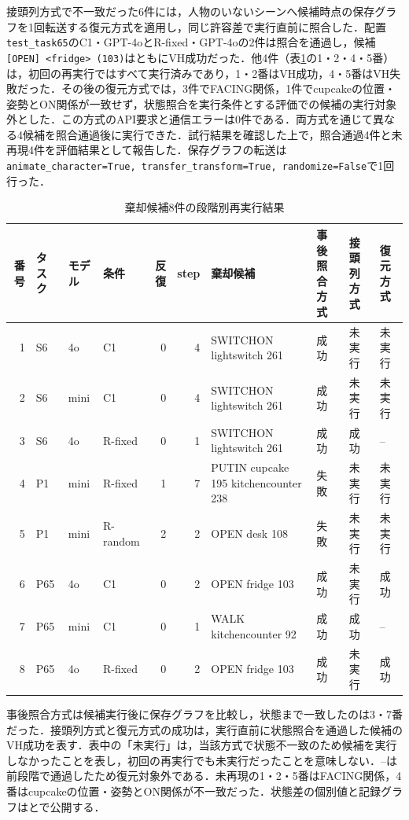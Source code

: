 接頭列方式で不一致だった6件には，人物のいないシーンへ候補時点の保存グラフを1回転送する復元方式を適用し，同じ許容差で実行直前に照合した．配置\texttt{test\_task65}のC1・GPT-4oとR-fixed・GPT-4oの2件は照合を通過し，候補\texttt{[OPEN] <fridge> (103)}はともにVH成功だった．他4件（表\ref{tab:replay_summary}の1・2・4・5番）は，初回の再実行ではすべて実行済みであり，1・2番はVH成功，4・5番はVH失敗だった．その後の復元方式では，3件でFACING関係，1件でcupcakeの位置・姿勢とON関係が一致せず，状態照合を実行条件とする評価での候補の実行対象外とした．この方式のAPI要求と通信エラーは0件である．両方式を通じて異なる4候補を照合通過後に実行できた．試行結果を確認した上で，照合通過4件と未再現4件を評価結果として報告した．保存グラフの転送は\texttt{animate\_character=True, transfer\_transform=True, randomize=False}で1回行った．


\begin{table}[tb]
\caption{棄却候補8件の段階別再実行結果}\label{tab:replay_summary}
\centering\scriptsize\setlength{\tabcolsep}{3pt}
\begin{tabular}{rlllrrp{}lll}
\hline
番号 & タスク & モデル & 条件 & 反復 & step & 棄却候補 & 事後照合方式 & 接頭列方式 & 復元方式 \\
\hline
1 & S6 & 4o & C1 & 0 & 4 & SWITCHON lightswitch 261 & 成功 & 未実行 & 未実行 \\
2 & S6 & mini & C1 & 0 & 4 & SWITCHON lightswitch 261 & 成功 & 未実行 & 未実行 \\
3 & S6 & 4o & R-fixed & 0 & 1 & SWITCHON lightswitch 261 & 成功 & 成功 & -- \\
4 & P1 & mini & R-fixed & 1 & 7 & PUTIN cupcake 195 kitchencounter 238 & 失敗 & 未実行 & 未実行 \\
5 & P1 & mini & R-random & 2 & 2 & OPEN desk 108 & 失敗 & 未実行 & 未実行 \\
6 & P65 & 4o & C1 & 0 & 2 & OPEN fridge 103 & 成功 & 未実行 & 成功 \\
7 & P65 & mini & C1 & 0 & 1 & WALK kitchencounter 92 & 成功 & 成功 & -- \\
8 & P65 & 4o & R-fixed & 0 & 2 & OPEN fridge 103 & 成功 & 未実行 & 成功 \\
\hline
\end{tabular}
\end{table}
事後照合方式は候補実行後に保存グラフを比較し，状態まで一致したのは3・7番だった．接頭列方式と復元方式の成功は，実行直前に状態照合を通過した候補のVH成功を表す．表中の「未実行」は，当該方式で状態不一致のため候補を実行しなかったことを表し，初回の再実行でも未実行だったことを意味しない．--は前段階で通過したため復元対象外である．未再現の1・2・5番はFACING関係，4番はcupcakeの位置・姿勢とON関係が不一致だった．状態差の個別値と記録グラフはとで公開する．

